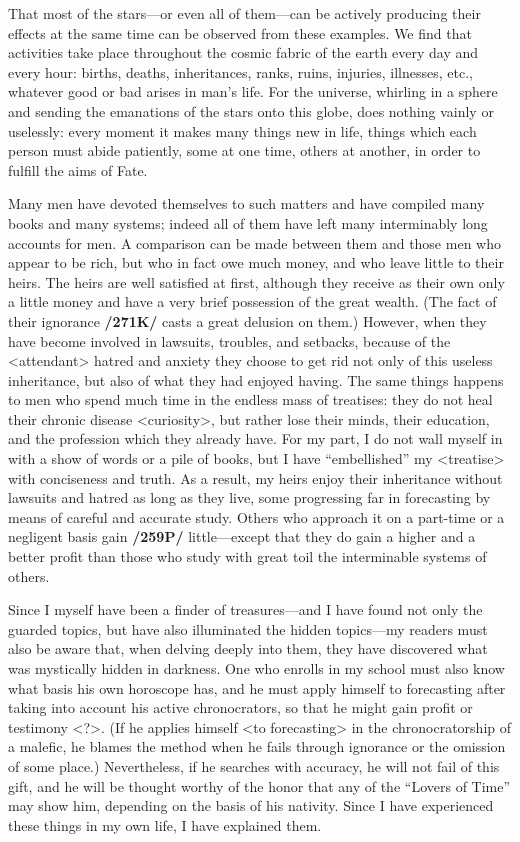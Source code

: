 That most of the stars—or even all of them—can be actively producing their effects at the same time can be observed from these examples. We find that activities take place throughout the cosmic fabric of the
earth every day and every hour: births, deaths, inheritances, ranks, ruins, injuries, illnesses, etc., whatever good or bad arises in man’s life. For the universe, whirling in a sphere and sending the emanations of the stars onto this globe, does nothing vainly or uselessly: every moment it makes many things new in life, things which each person must abide patiently, some at one time, others at another, in order to fulfill the aims of Fate.

Many men have devoted themselves to such matters and have compiled many books and many systems; indeed all of them have left many interminably long accounts for men. A comparison can be
made between them and those men who appear to be rich, but who in fact owe much money, and who leave little to their heirs. The heirs are well satisfied at first, although they receive as their own only a little money and have a very brief possession of the great wealth. (The fact of their ignorance \textbf{/271K/} casts a great delusion on them.) However, when they have become involved in lawsuits, troubles, and setbacks, because of the <attendant> hatred and anxiety they choose to get rid not only of this useless inheritance,
but also of what they had enjoyed having. The same things happens to men who spend much time in the endless mass of treatises: they do not heal their chronic disease <curiosity>, but rather lose their minds, their education, and the profession which they already have.
For my part, I do not wall myself in with a show of words or a pile of books, but I have “embellished” my <treatise> with conciseness and truth. As a result, my heirs enjoy their inheritance without lawsuits and hatred as long as they live, some progressing far in forecasting by means of careful and accurate study. Others who approach it on a part-time or a negligent basis gain \textbf{/259P/} little—except that
they do gain a higher and a better profit than those who study with great toil the interminable systems of others.

Since I myself have been a finder of treasures—and I have found not only the guarded topics, but have also illuminated the hidden topics—my readers must also be aware that, when delving deeply into them,
they have discovered what was mystically hidden in darkness. One who enrolls in my school must also know what basis his own horoscope has, and he must apply himself to forecasting after taking into account his active chronocrators, so that he might gain profit or testimony <?>. (If he applies himself <to forecasting> in the chronocratorship of a malefic, he blames the method when he fails through ignorance or the omission of some place.) Nevertheless, if he searches with accuracy, he will not fail of this gift, and he will be thought worthy of the honor that any of the “Lovers of Time” may show him, depending on the basis of his nativity. Since I have experienced these things in my own life, I have explained them.

